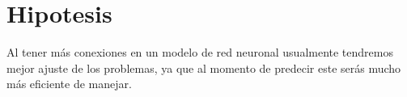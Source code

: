 \section{Hipotesis}
    Al tener m\'as conexiones en un modelo de red neuronal usualmente tendremos mejor ajuste de los 
    problemas, ya que al momento de predecir este ser\'as mucho m\'as eficiente de manejar.